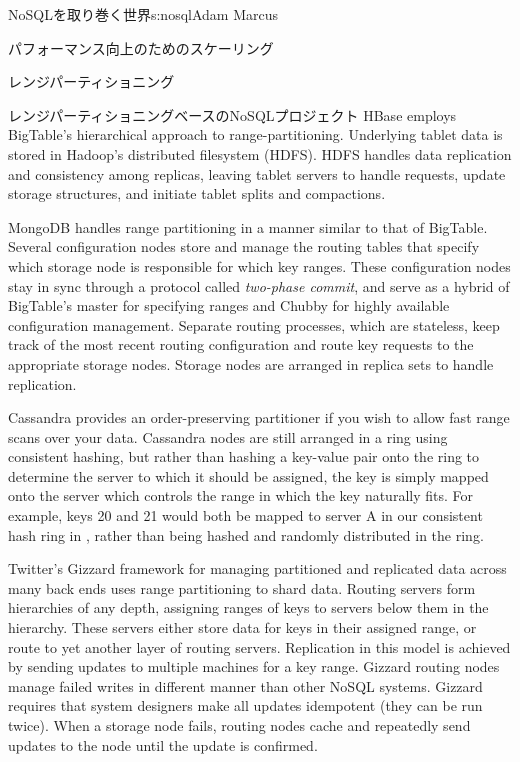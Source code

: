 \begin{aosachapter}{NoSQLを取り巻く世界}{s:nosql}{Adam Marcus}
\begin{aosasect1}{パフォーマンス向上のためのスケーリング}
\begin{aosasect2}{レンジパーティショニング}
\begin{aosasect3}{レンジパーティショニングベースのNoSQLプロジェクト}
HBase employs BigTable's hierarchical approach to range-partitioning.
Underlying tablet data is stored in Hadoop's distributed filesystem
(HDFS).  HDFS handles data replication and consistency among replicas,
leaving tablet servers to handle requests, update storage structures,
and initiate tablet splits and compactions.

MongoDB handles range partitioning in a manner similar to that of
BigTable.  Several configuration nodes store and manage the routing
tables that specify which storage node is responsible for which key
ranges.  These configuration nodes stay in sync through a protocol
called \emph{two-phase commit}, and serve as a hybrid of BigTable's
master for specifying ranges and Chubby for highly available
configuration management.  Separate routing processes, which are
stateless, keep track of the most recent routing configuration and
route key requests to the appropriate storage nodes.  Storage nodes
are arranged in replica sets to handle replication.

Cassandra provides an order-preserving partitioner if you wish to
allow fast range scans over your data.  Cassandra nodes are still arranged
in a ring using consistent hashing, but rather than hashing a
key-value pair onto the ring to determine the server to which it
should be assigned, the key is simply mapped onto the server which
controls the range in which the key naturally fits.  For example, keys
20 and 21 would both be mapped to server A in our consistent hash ring
in , rather than being hashed and
randomly distributed in the ring.

Twitter's Gizzard framework for managing partitioned and replicated
data across many back ends uses range partitioning to shard data.
Routing servers form hierarchies of any depth, assigning ranges of
keys to servers below them in the hierarchy.  These servers either
store data for keys in their assigned range, or route to yet another
layer of routing servers.  Replication in this model is achieved by sending
updates to multiple machines for a key range.  Gizzard routing nodes
manage failed writes in different manner than other NoSQL systems.
Gizzard requires that system designers make all updates idempotent
(they can be run twice).  When a storage node fails, routing nodes
cache and repeatedly send updates to the node until the update is
confirmed.

\end{aosasect3}

\end{aosasect2}


\end{aosasect1}
\end{aosachapter}
